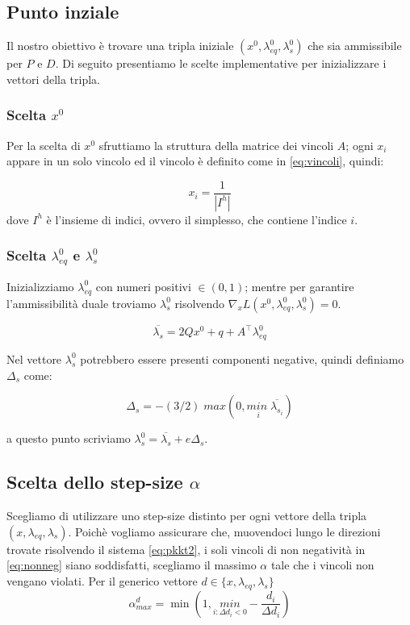 \subsection{Punto inziale}\label{cap:sp}
Il nostro obiettivo è trovare una tripla iniziale $(x^0, \lambda_{eq}^0, \lambda_s^0)$ che sia ammissibile per $P$ e $D$.
Di seguito presentiamo le scelte implementative per inizializzare i vettori della tripla.

\subsubsection*{Scelta $x^0$}
Per la scelta di $x^0$ sfruttiamo la struttura della matrice dei vincoli $A$; ogni $x_i$ appare in un solo vincolo ed il vincolo è definito come in \ref{eq:vincoli}, quindi: 

\begin{equation}\label{eq:startx}
  x_i=\frac{1}{|I^h|}  
\end{equation}
dove $I^h$ è l'insieme di indici, ovvero il simplesso, che contiene l'indice $i$.

\subsubsection*{Scelta $\lambda^0_{eq}$ e $\lambda^0_{s}$}
Inizializziamo $\lambda^0_{eq}$ con numeri positivi $\in (0,1)$; mentre per garantire l'ammissibilità duale troviamo $\lambda^0_s$ risolvendo 
$\nabla _x L(x^0, \lambda_{eq}^0, \lambda_s^0) = 0$.

\begin{equation}\label{eq:startl}
\overline{\lambda_s} = 2Qx^0+q+A^\intercal\lambda_{eq}^0
\end{equation}

Nel vettore $\lambda_s^0$ potrebbero essere presenti componenti negative, quindi definiamo $\Delta_s$ come:

\begin{equation}\label{eq:startdl}
\Delta_s = -(3/2)\;max(0, \underset{i}{min\;}\overline{\lambda_{s_i}})
\end{equation}

a questo punto scriviamo $\lambda_s^0 = \overline{\lambda_s} + e \Delta_s$. 


\subsection{Scelta dello step-size $\alpha$}
Scegliamo di utilizzare uno step-size distinto per ogni vettore della tripla $(x, \lambda_{eq}, \lambda_s)$.
Poichè vogliamo assicurare che, muovendoci lungo le direzioni trovate risolvendo il sistema \ref{eq:pkkt2}, i soli vincoli di non negatività in \ref{eq:nonneg} siano soddisfatti, scegliamo il massimo $\alpha$ tale che i vincoli non vengano violati.
Per il generico vettore $d \in \{x,\lambda_{eq},\lambda_s\} $ 
\begin{equation}\label{eq:alpha}
    \alpha^d_{max} = \min (1, \underset{i:\Delta d_i < 0}{min}-\frac{d_i}{\Delta d_i})
\end{equation}

